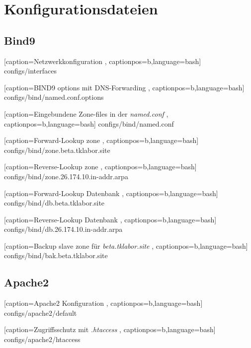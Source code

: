 \section{Konfigurationsdateien}

\subsection{Bind9}

    [caption={Netzwerkkonfiguration}
       \label{lst:interfaces},
       captionpos=b,language=bash]
{configs/interfaces}


    [caption={BIND9 options mit DNS-Forwarding}
       \label{lst:named.conf.options},
       captionpos=b,language=bash]
{configs/bind/named.conf.options}


    [caption={Eingebundene Zone-files in der \textit{named.conf}}
       \label{lst:named.conf},
       captionpos=b,language=bash]
{configs/bind/named.conf}


    [caption={Forward-Lookup zone}
       \label{lst:forward-zone},
       captionpos=b,language=bash]
{configs/bind/zone.beta.tklabor.site}


    [caption={Reverse-Lookup zone}
       \label{lst:reverse-zone},
       captionpos=b,language=bash]
{configs/bind/zone.26.174.10.in-addr.arpa}


    [caption={Forward-Lookup Datenbank}
       \label{lst:forware-zone-db},
       captionpos=b,language=bash]
{configs/bind/db.beta.tklabor.site}


    [caption={Reverse-Lookup Datenbank}
       \label{lst:reverse-zone-db},
       captionpos=b,language=bash]
{configs/bind/db.26.174.10.in-addr.arpa}


    [caption={Backup slave zone für \textit{beta.tklabor.site}}
       \label{lst:back.beta.tklabor.site},
       captionpos=b,language=bash]
{configs/bind/bak.beta.tklabor.site}

\subsection{Apache2}

    [caption={Apache2 Konfiguration}
       \label{lst:auth-config},
       captionpos=b,language=bash]
{configs/apache2/default}


    [caption={Zugriffsschutz mit \textit{.htaccess}}
       \label{lst:htaccess},
       captionpos=b,language=bash]
{configs/apache2/htaccess}


